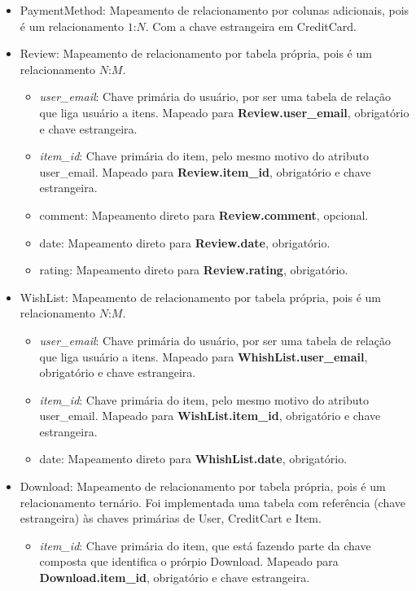 \documentclass[a4paper, 11pt]{article}
\begin{document}
\begin{itemize}
    \item PaymentMethod: Mapeamento de relacionamento por colunas adicionais, pois é um relacionamento $1$:$N$. Com a chave estrangeira em CreditCard.
    \item Review: Mapeamento de relacionamento por tabela própria, pois é um relacionamento $N$:$M$.
    \begin{itemize}
        \item {\textit{user\_email}}: Chave primária do usuário, por ser uma tabela de relação que liga usuário a itens. Mapeado para {\textbf{Review.user\_email}}, obrigatório e chave estrangeira.
        \item {\textit{item\_id}}: Chave primária do item, pelo mesmo motivo do atributo user\_email. Mapeado para {\textbf{Review.item\_id}}, obrigatório e chave estrangeira.
        \item comment: Mapeamento direto para {\textbf{Review.comment}}, opcional.
        \item date: Mapeamento direto para {\textbf{Review.date}}, obrigatório.
        \item rating: Mapeamento direto para {\textbf{Review.rating}}, obrigatório.
    \end{itemize}
    \item WishList: Mapeamento de relacionamento por tabela própria, pois é um relacionamento $N$:$M$. 
    \begin{itemize}
        \item {\textit{user\_email}}: Chave primária do usuário, por ser uma tabela de relação que liga usuário a itens. Mapeado para {\textbf{WhishList.user\_email}}, obrigatório e chave estrangeira.
        \item {\textit{item\_id}}: Chave primária do item, pelo mesmo motivo do atributo user\_email. Mapeado para {\textbf{WishList.item\_id}}, obrigatório e chave estrangeira.
        \item date: Mapeamento direto para  {\textbf{WhishList.date}}, obrigatório.
    \end{itemize}
    \item Download: Mapeamento de relacionamento por tabela própria, pois é um relacionamento ternário. Foi implementada uma tabela com referência (chave estrangeira) às chaves primárias de User, CreditCart e Item.
    \begin{itemize}
        \item {\textit{item\_id}}: Chave primária do item, que está fazendo parte da chave composta que identifica o prórpio Download. Mapeado para {\textbf{Download.item\_id}}, obrigatório e chave estrangeira.

\end{itemize}
\end{itemize}
\end{document}
